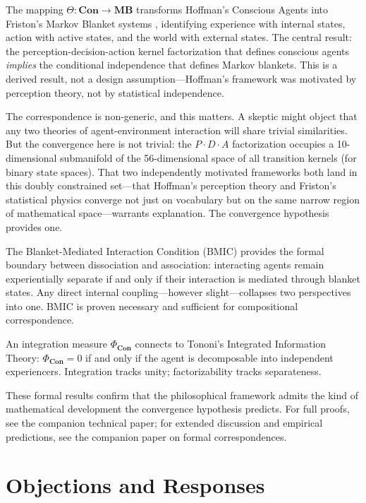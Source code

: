 \documentclass[11pt,a4paper]{article}
\theoremstyle{definition}
\theoremstyle{plain}
\theoremstyle{remark}
\newcommand{\Con}{\mathbf{Con}}
\newcommand{\MB}{\mathbf{MB}}
\begin{document}
The mapping $\Theta: \Con \to \MB$ transforms Hoffman's Conscious Agents \citep{Hoffman2014} into Friston's Markov Blanket systems \citep{Friston2019}, identifying experience with internal states, action with active states, and the world with external states. The central result: the perception-decision-action kernel factorization that defines conscious agents \textit{implies} the conditional independence that defines Markov blankets. This is a derived result, not a design assumption---Hoffman's framework was motivated by perception theory, not by statistical independence.

The correspondence is non-generic, and this matters. A skeptic might object that any two theories of agent-environment interaction will share trivial similarities. But the convergence here is not trivial: the $P \cdot D \cdot A$ factorization occupies a 10-dimensional submanifold of the 56-dimensional space of all transition kernels (for binary state spaces). That two independently motivated frameworks both land in this doubly constrained set---that Hoffman's perception theory and Friston's statistical physics converge not just on vocabulary but on the same narrow region of mathematical space---warrants explanation. The convergence hypothesis provides one.

The Blanket-Mediated Interaction Condition (BMIC) provides the formal boundary between dissociation and association: interacting agents remain experientially separate if and only if their interaction is mediated through blanket states. Any direct internal coupling---however slight---collapses two perspectives into one. BMIC is proven necessary and sufficient for compositional correspondence.

An integration measure $\Phi_{\Con}$ connects to Tononi's Integrated Information Theory: $\Phi_{\Con} = 0$ if and only if the agent is decomposable into independent experiencers. Integration tracks unity; factorizability tracks separateness.

These formal results confirm that the philosophical framework admits the kind of mathematical development the convergence hypothesis predicts. For full proofs, see the companion technical paper; for extended discussion and empirical predictions, see the companion paper on formal correspondences.

\section{Objections and Responses}\label{sec:objections}
\end{document}
